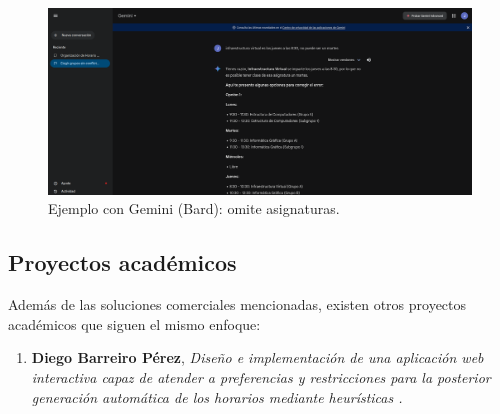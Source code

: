     \begin{figure}[H]
        \centering
        \includegraphics[width=1\textwidth]{./imagenes/Gemini.png}
        \caption{Ejemplo con Gemini (Bard): omite asignaturas.}
    \end{figure}


\subsection{Proyectos académicos}

Además de las soluciones comerciales mencionadas, existen otros proyectos académicos que siguen el mismo enfoque:

\begin{enumerate}
    \item \textbf{Diego Barreiro Pérez}, \textit{Diseño e implementación de una aplicación web interactiva capaz de atender a preferencias y restricciones para la posterior generación automática de los horarios mediante heurísticas \cite{Barreiro}.}
\end{enumerate}




